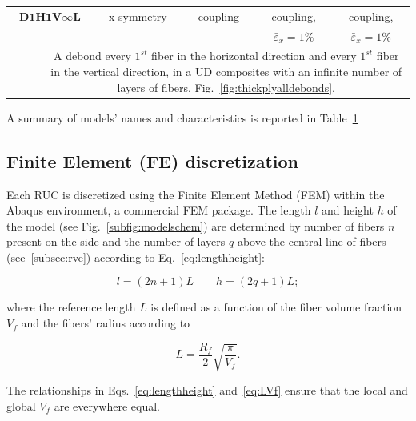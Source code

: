 \documentclass[review]{elsarticle}
\begin{document}
\begin{table}[!h]
\begin{tabularx}{\textwidth}{p{}ccccc}
\midrule
\multicolumn{2}{c}{$\mathbf{D1H1V\infty L}$} &x-symmetry&coupling&coupling,&coupling,\\
                                                         &  &  &  & $\bar{\varepsilon}_{x}=1\%$ & $\bar{\varepsilon}_{x}=1\%$ \\
&\multicolumn{5}{X}{\small A debond every $1^{st}$ fiber in the horizontal direction and every $1^{st}$ fiber in the vertical direction, in a UD composites with an infinite number of  layers of fibers, Fig.~\ref{fig:thickplyalldebonds}.}\\
\bottomrule
\end{tabularx}
\label{tab:modelcharacteristics}
\end{table}

A summary of models' names and characteristics is reported in Table~\ref{tab:modelcharacteristics}

\subsection{Finite Element (FE) discretization}

Each RUC is discretized using the Finite Element Method (FEM) within the Abaqus environment, a commercial FEM package. The length $l$ and height $h$ of the model (see Fig.~\ref{subfig:modelschem}) are determined by number of fibers $n$ present on the side and the number of layers $q$ above the central line of fibers (see~\ref{subsec:rve}) according to Eq.~\ref{eq:lengthheight}:

\begin{equation}\label{eq:lengthheight}
l=\left(2n+1\right)L\qquad h=\left(2q+1\right)L;
\end{equation}

where the reference length $L$ is defined as a function of the fiber volume fraction $V_{f}$ and the fibers' radius according to

\begin{equation}\label{eq:LVf}
L=\frac{R_{f}}{2}\sqrt{\frac{\pi}{V_{f}}}.
\end{equation}

The relationships in Eqs.~\ref{eq:lengthheight} and~\ref{eq:LVf} ensure that the local and global $V_{f}$ are everywhere equal. 
\end{document}
